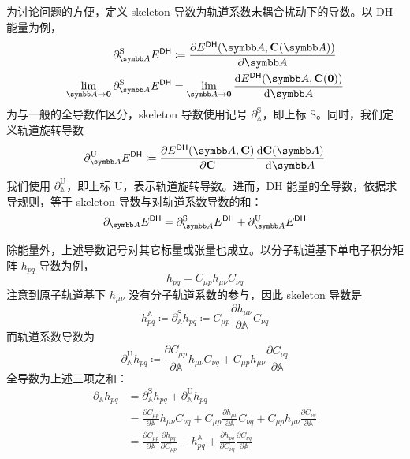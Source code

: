 为讨论问题的方便，定义 skeleton 导数为轨道系数未耦合扰动下的导数。以 DH 能量为例，
\begin{align}
    \partial_\mathbb{A}^\mathrm{S} E^\textmt{DH}
    &\coloneq \frac{\partial E^\textmt{DH} (\mathbb{A}, \mathbf{C} (\mathbb{A}))}{\partial \mathbb{A}} \\
    \lim_{\mathbb{A} \rightarrow \mathbf{0}} \partial_\mathbb{A}^\mathrm{S} E^\textmt{DH}
    &= \lim_{\mathbb{A} \rightarrow \mathbf{0}} \frac{\mathrm{d} E^\textmt{DH} (\mathbb{A}, \mathbf{C} (\mathbf{0}))}{\mathrm{d} \mathbb{A}} \notag
\end{align}
为与一般的全导数作区分，skeleton 导数使用记号 $\partial_\mathbb{A}^\mathrm{S}$，即上标 $\mathrm{S}$。同时，我们定义轨道旋转导数
\begin{equation}
    \partial_\mathbb{A}^\mathrm{U} E^\textmt{DH} \coloneq \frac{\partial E^\textmt{DH} (\mathbb{A}, \mathbf{C})}{\partial \mathbf{C}} \frac{\mathrm{d} \mathbf{C} (\mathbb{A})}{\mathrm{d} \mathbb{A}}
\end{equation}
我们使用 $\partial_\mathbb{A}^\mathrm{U}$，即上标 $\mathrm{U}$，表示轨道旋转导数。进而，DH 能量的全导数，依据求导规则，等于 skeleton 导数与对轨道系数导数的和：
\begin{equation}
    \partial_\mathbb{A} E^\textmt{DH} = \partial_\mathbb{A}^\mathrm{S} E^\textmt{DH} + \partial_\mathbb{A}^\mathrm{U} E^\textmt{DH}
\end{equation}

除能量外，上述导数记号对其它标量或张量也成立。以分子轨道基下单电子积分矩阵 $h_{pq}$ 导数为例，
\begin{equation*}
    h_{pq} = C_{\mu p} h_{\mu \nu} C_{\nu q}
\end{equation*}
注意到原子轨道基下 $h_{\mu \nu}$ 没有分子轨道系数的参与，因此 skeleton 导数是
\begin{equation*}
    h_{pq}^\mathbb{A} \coloneq \partial_\mathbb{A}^\mathrm{S} h_{pq} \coloneq C_{\mu p} \frac{\partial h_{\mu \nu}}{\partial \mathbb{A}} C_{\nu q}
\end{equation*}
而轨道系数导数为
\begin{equation*}
    \partial_\mathbb{A}^\mathrm{U} h_{pq} \coloneq \frac{\partial C_{\mu p}}{\partial \mathbb{A}} h_{\mu \nu} C_{\nu q} + C_{\mu p} h_{\mu \nu} \frac{\partial C_{\nu q}}{\partial \mathbb{A}}
\end{equation*}
全导数为上述三项之和：
\begin{align*}
    \partial_\mathbb{A} h_{pq} &= \partial_\mathbb{A}^\mathrm{S} h_{pq} + \partial_\mathbb{A}^\mathrm{U} h_{pq} \\
    &= \frac{\partial C_{\mu p}}{\partial \mathbb{A}} h_{\mu \nu} C_{\nu q} + C_{\mu p} \frac{\partial h_{\mu \nu}}{\partial \mathbb{A}} C_{\nu q} + C_{\mu p} h_{\mu \nu} \frac{\partial C_{\nu q}}{\partial \mathbb{A}} \\
    &= \frac{\partial C_{\mu p}}{\partial \mathbb{A}} \frac{\partial h_{pq}}{\partial C_{\mu p}} + h_{pq}^\mathbb{A} + \frac{\partial h_{pq}}{\partial C_{\nu q}} \frac{\partial C_{\nu q}}{\partial \mathbb{A}}
\end{align*}

